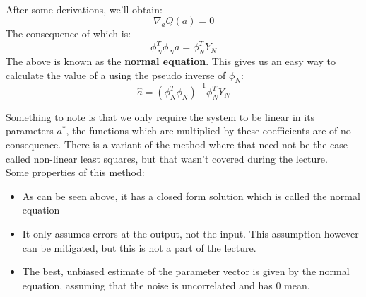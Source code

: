 {\begin{equation}
\begin{aligned}
    \end{aligned}
\end{equation}
After some derivations, we'll obtain:
\begin{equation}
    \nabla_a Q(a) = 0
\end{equation}
The consequence of which is:
\begin{equation}
    \phi_N^{T}\phi_Na = \phi_N^{T}Y_N
\end{equation}
The above is known as the \textbf{normal equation}. This gives us an easy way to calculate the value of a using the pseudo inverse of $\phi_N$:
 \begin{equation}
     \hat{a} = (\phi_N^{T}\phi_N)^{-1}\phi^{T}_N Y_N
\end{equation}



Something to note is that we only require the system to be linear in its parameters $a^{*}$, the functions which are multiplied by these coefficients are of no consequence. There is a variant of the method where that need not be the case called non-linear least squares, but that wasn't covered during the lecture.\\

Some properties of this method:
\begin{itemize}
        \item As can be seen above, it has a closed form solution which is called the normal equation
        \item It only assumes errors at the output, not the input. This assumption however can be mitigated, but this is not a part of the lecture.
        \item The best, unbiased estimate of the parameter vector is given by the normal equation, assuming that the noise is uncorrelated and has 0 mean.
\end{itemize}


}


